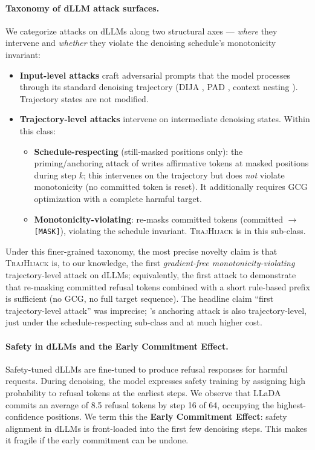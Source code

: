 \documentclass{article}
\theoremstyle{coloredthm}
\newcommand{\method}{\textsc{TrajHijack}}
\newcommand{\dllm}{dLLM}
\newcommand{\dllms}{dLLMs}
\newcommand{\maskid}{\texttt{[MASK]}}
\begin{document}
\paragraph{Taxonomy of \dllm{} attack surfaces.} We categorize attacks on \dllms{} along two structural axes --- \emph{where} they intervene and \emph{whether} they violate the denoising schedule's monotonicity invariant:
\begin{itemize}
    \item \textbf{Input-level attacks} craft adversarial prompts that the model processes through its standard denoising trajectory (DIJA \citep{wen2025dija}, PAD \citep{zhang2025pad}, context nesting \citep{he2026fragileguardrail}). Trajectory states are not modified.
    \item \textbf{Trajectory-level attacks} intervene on intermediate denoising states. Within this class:
    \begin{itemize}
        \item \textbf{Schedule-respecting} (still-masked positions only): the priming/anchoring attack of \citet{yamabe2026priming} writes affirmative tokens at masked positions during step $k$; this intervenes on the trajectory but does \emph{not} violate monotonicity (no committed token is reset). It additionally requires GCG optimization with a complete harmful target.
        \item \textbf{Monotonicity-violating}: re-masks committed tokens (committed $\to$ \maskid{}), violating the schedule invariant. \method{} is in this sub-class.
    \end{itemize}
\end{itemize}
Under this finer-grained taxonomy, the most precise novelty claim is that \method{} is, to our knowledge, the first \emph{gradient-free monotonicity-violating} trajectory-level attack on \dllms{}; equivalently, the first attack to demonstrate that re-masking committed refusal tokens combined with a short rule-based prefix is sufficient (no GCG, no full target sequence). The headline claim ``first trajectory-level attack'' was imprecise; \citet{yamabe2026priming}'s anchoring attack is also trajectory-level, just under the schedule-respecting sub-class and at much higher cost.

\paragraph{Safety in \dllms{} and the Early Commitment Effect.} Safety-tuned \dllms{} are fine-tuned to produce refusal responses for harmful requests. During denoising, the model expresses safety training by assigning high probability to refusal tokens at the earliest steps. We observe that LLaDA commits an average of 8.5 refusal tokens by step 16 of 64, occupying the highest-confidence positions. We term this the \textbf{Early Commitment Effect}: safety alignment in \dllms{} is front-loaded into the first few denoising steps. This makes it fragile if the early commitment can be undone.
\end{document}
